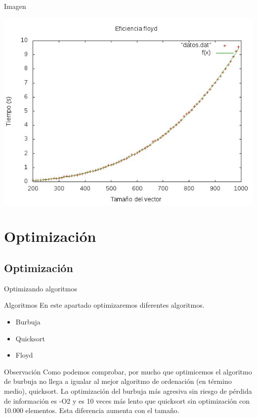 \documentclass[compress]{beamer}
\begin{document}
\begin{frame}
	\begin{alertblock}{Imagen}
	\begin{center}
	\includegraphics[scale=0.50]{../Graficas/Floyd/floydO0_ruben.jpeg}	
	\end{center}
	\end{alertblock}
\end{frame}




\section{Optimización}
\subsection{Optimización}
\begin{frame}{Optimizando algoritmos}
	\begin{block}{Algoritmos}
	En este apartado optimizaremos diferentes algoritmos.
	\begin{itemize}
	\item Burbuja
	\item Quicksort
	\item Floyd
	\end{itemize}
	\end{block}
	
	\pause
	\begin{block}{Observación}
	Como podemos comprobar, por mucho que optimicemos el algoritmo de burbuja no llega a igualar al mejor algoritmo de ordenación (en término medio), quicksort. La optimización del burbuja más agresiva sin riesgo de pérdida de información es -O2 y es 10 veces más lento que quicksort sin optimización con 10.000 elementos. Esta diferencia aumenta con el tamaño.
	\end{block}
\end{frame}
\end{document}
